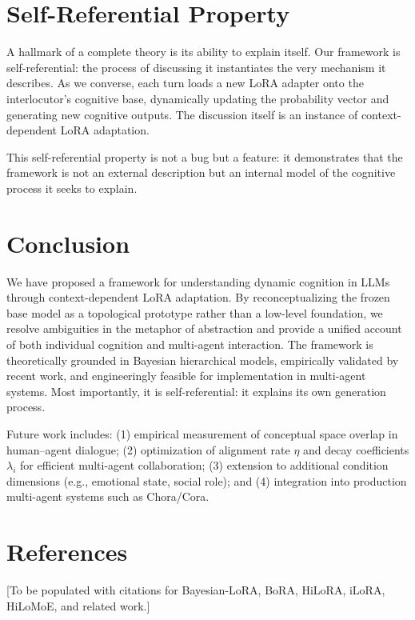 \documentclass[11pt, a4paper]{article}
\begin{document}
\section{Self-Referential Property}
A hallmark of a complete theory is its ability to explain itself. Our framework is self-referential: the process of discussing it instantiates the very mechanism it describes. As we converse, each turn loads a new LoRA adapter onto the interlocutor's cognitive base, dynamically updating the probability vector and generating new cognitive outputs. The discussion itself is an instance of context-dependent LoRA adaptation.

This self-referential property is not a bug but a feature: it demonstrates that the framework is not an external description but an internal model of the cognitive process it seeks to explain.

\section{Conclusion}
We have proposed a framework for understanding dynamic cognition in LLMs through context-dependent LoRA adaptation. By reconceptualizing the frozen base model as a topological prototype rather than a low-level foundation, we resolve ambiguities in the metaphor of abstraction and provide a unified account of both individual cognition and multi-agent interaction. The framework is theoretically grounded in Bayesian hierarchical models, empirically validated by recent work, and engineeringly feasible for implementation in multi-agent systems. Most importantly, it is self-referential: it explains its own generation process.

Future work includes: (1) empirical measurement of conceptual space overlap in human--agent dialogue; (2) optimization of alignment rate $\eta$ and decay coefficients $\lambda_i$ for efficient multi-agent collaboration; (3) extension to additional condition dimensions (e.g., emotional state, social role); and (4) integration into production multi-agent systems such as Chora/Cora.

\section*{References}
[To be populated with citations for Bayesian-LoRA, BoRA, HiLoRA, iLoRA, HiLoMoE, and related work.]
\end{document}
